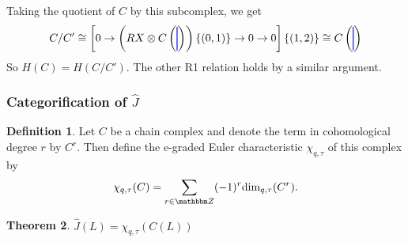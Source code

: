 \documentclass{amsart}
\newcommand{\hackcenter}[1]{
 \xy (0,0)*{#1}; \endxy}
\theoremstyle{plain}
\newtheorem{theorem}{Theorem}
\theoremstyle{definition}
\newtheorem{definition}[theorem]{Definition}
\theoremstyle{definition}
\numberwithin{equation}{section}
\numberwithin{theorem}{section}
\renewcommand{\to}{\rightarrow}
\numberwithin{equation}{section}
\let\hat=\widehat
\def\Z{{\mathbbm Z}}
\begin{document}
Taking the quotient of $C$ by this subcomplex, we get
\[
C/C'\cong
\left[
0\to \left(R X \otimes C\left(
\hackcenter{ \begin{tikzpicture} [scale=.75]
\draw[thick,   blue] (0,0) to (0,1);
\end{tikzpicture}}\right)
\right)\{(0,1)\}\to
0
\to 0
\right]\{(1,2)\}
\cong
C\left(
\hackcenter{ \begin{tikzpicture} [scale=.75]
\draw[thick,   blue] (0,0) to (0,1);
\end{tikzpicture}}\right)
\]
So $H(C)=H(C/C')$.
The other R1 relation holds by a similar argument.

\subsubsection{Categorification of $\hat{J}$}
\begin{definition}
  Let $C$ be a chain complex and denote the term in cohomological degree $r$ by $C^r$. Then define the e-graded Euler characteristic $\chi_{q,\tau}$ of this complex by
  \begin{align*}
  \chi_{q,\tau}(C)=\sum\limits_{r\in \Z} (-1)^{r} \text{dim}_{q,\tau}(C^r).
\end{align*}
\end{definition}


\begin{theorem}
  $\hat{J}(L)= \chi_{q,\tau}(C(L))$
\end{theorem}
\end{document}
